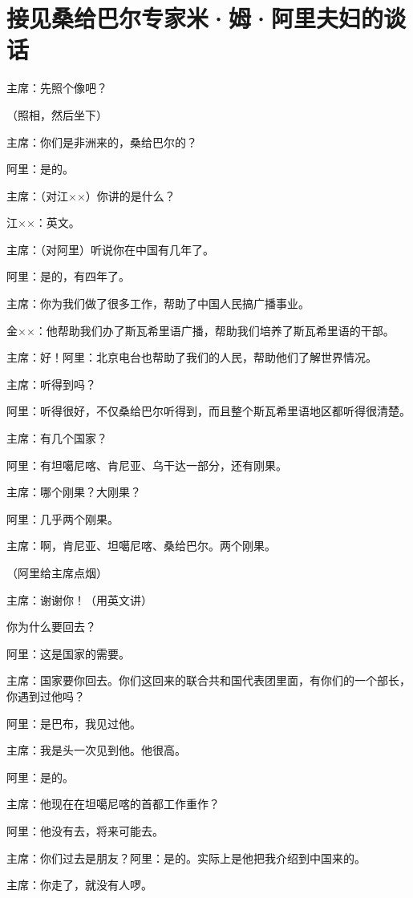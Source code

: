 \section[接见桑给巴尔专家米·姆·阿里夫妇的谈话（一九六四年六月十八日）]{接见桑给巴尔专家米·姆·阿里夫妇的谈话}


主席：先照个像吧？

（照相，然后坐下）

主席：你们是非洲来的，桑给巴尔的？

阿里：是的。

主席：（对江××）你讲的是什么？

江××：英文。

主席：（对阿里）听说你在中国有几年了。

阿里：是的，有四年了。

主席：你为我们做了很多工作，帮助了中国人民搞广播事业。

金××：他帮助我们办了斯瓦希里语广播，帮助我们培养了斯瓦希里语的干部。

主席：好！阿里：北京电台也帮助了我们的人民，帮助他们了解世界情况。

主席：听得到吗？

阿里：听得很好，不仅桑给巴尔听得到，而且整个斯瓦希里语地区都听得很清楚。

主席：有几个国家？

阿里：有坦噶尼喀、肯尼亚、乌干达一部分，还有刚果。

主席：哪个刚果？大刚果？

阿里：几乎两个刚果。

主席：啊，肯尼亚、坦噶尼喀、桑给巴尔。两个刚果。

（阿里给主席点烟）

主席：谢谢你！（用英文讲）

你为什么要回去？

阿里：这是国家的需要。

主席：国家要你回去。你们这回来的联合共和国代表团里面，有你们的一个部长，你遇到过他吗？

阿里：是巴布，我见过他。

主席：我是头一次见到他。他很高。

阿里：是的。

主席：他现在在坦噶尼喀的首都工作重作？

阿里：他没有去，将来可能去。

主席：你们过去是朋友？阿里：是的。实际上是他把我介绍到中国来的。

主席：你走了，就没有人啰。

